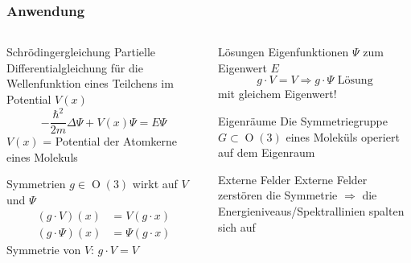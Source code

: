 %
%
%
\bgroup
\begin{frame}[t]
\setlength{\abovedisplayskip}{5pt}
\setlength{\belowdisplayskip}{5pt}
\frametitle{Anwendung}
\vspace{-20pt}
\begin{columns}[t,onlytextwidth]
\begin{column}{0.48\textwidth}
\begin{block}{Schrödingergleichung}
Partielle Differentialgleichung für die Wellenfunktion
eines Teilchens im Potential $V(x)$
\[
-\frac{\hbar^2}{2m}\Delta \Psi
+
V(x)\Psi
=
E\Psi
\]
$V(x)$ = Potential der Atomkerne eines Molekuls
\end{block}
\begin{block}{Symmetrien}
$g\in\operatorname{O}(3)$  wirkt auf $V$ und $\Psi$
\begin{align*}
(g\cdot V)(x) &= V(g\cdot x)
\\
(g\cdot \Psi)(x) &= \Psi(g\cdot x)
\end{align*}
Symmetrie von $V$: $g\cdot V=V$
\end{block}
\end{column}
\begin{column}{0.48\textwidth}
\begin{block}{Lösungen}
Eigenfunktionen $\Psi$ zum Eigenwert $E$
\[
g\cdot V=V
\Rightarrow
g\cdot \Psi
\text{ Lösung}
\]
mit gleichem Eigenwert!
\end{block}
\begin{block}{Eigenräume}
Die Symmetriegruppe $G\subset \operatorname{O}(3)$ eines Moleküls
operiert auf dem Eigenraum
\end{block}
\begin{block}{Externe Felder}
Externe Felder zerstören die Symmetrie
$\Rightarrow$
die Energieniveaus/Spektrallinien spalten sich auf
\end{block}
\end{column}
\end{columns}
\end{frame}
\egroup
